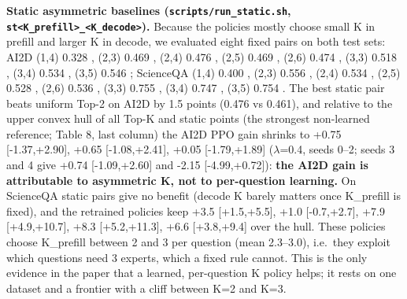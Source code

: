 \textbf{Static asymmetric baselines (\texttt{scripts/run\_static.sh}, \texttt{st\textless{}K\_prefill\textgreater{}\_\textless{}K\_decode\textgreater{}}).} Because the policies mostly choose small K in prefill and larger K in decode, we evaluated eight fixed pairs on both test sets: AI2D (1,4) 0.328 \citet{0.170}, (2,3) 0.469 \citet{0.336}, (2,4) 0.476 \citet{0.339}, (2,5) 0.469 \citet{0.341}, (2,6) 0.474 \citet{0.344}, (3,3) 0.518 \citet{0.500}, (3,4) 0.534 \citet{0.505}, (3,5) 0.546 \citet{0.510}; ScienceQA (1,4) 0.400 \citet{0.173}, (2,3) 0.556 \citet{0.338}, (2,4) 0.534 \citet{0.342}, (2,5) 0.528 \citet{0.345}, (2,6) 0.536 \citet{0.349}, (3,3) 0.755 \citet{0.500}, (3,4) 0.747 \citet{0.505}, (3,5) 0.754 \citet{0.509}. The best static pair beats uniform Top-2 on AI2D by 1.5 points (0.476 vs 0.461), and relative to the upper convex hull of all Top-K and static points (the strongest non-learned reference; Table 8, last column) the AI2D PPO gain shrinks to +0.75 {[}-1.37,+2.90{]}, +0.65 {[}-1.08,+2.41{]}, +0.05 {[}-1.79,+1.89{]} ($\lambda$=0.4, seeds 0--2; seeds 3 and 4 give +0.74 {[}-1.09,+2.60{]} and -2.15 {[}-4.99,+0.72{]}): \textbf{the AI2D gain is attributable to asymmetric K, not to per-question learning.} On ScienceQA static pairs give no benefit (decode K barely matters once K\_prefill is fixed), and the retrained policies keep +3.5 {[}+1.5,+5.5{]}, +1.0 {[}-0.7,+2.7{]}, +7.9 {[}+4.9,+10.7{]}, +8.3 {[}+5.2,+11.3{]}, +6.6 {[}+3.8,+9.4{]} over the hull. These policies choose K\_prefill between 2 and 3 per question (mean 2.3--3.0), i.e.~they exploit which questions need 3 experts, which a fixed rule cannot. This is the only evidence in the paper that a learned, per-question K policy helps; it rests on one dataset and a frontier with a cliff between K=2 and K=3.

